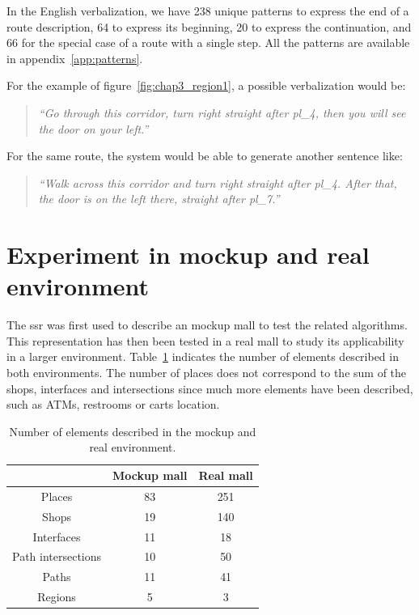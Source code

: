 In the English verbalization, we have 238 unique patterns to express the end of a route description, 64 to express its beginning, 20 to express the continuation, and 66 for the special case of a route with a single step. All the patterns are available in appendix~\ref{app:patterns}.

For the example of figure~\ref{fig:chap3_region1}, a possible verbalization would be:

\begin{quote} 
\centering 
\textit{
``Go through this corridor, turn right straight after pl\_4, then you will see the door on your left.''}
\end{quote}

For the same route, the system would be able to generate another sentence like:

\begin{quote} 
\centering 
\textit{
``Walk across this corridor and turn right straight after pl\_4. After that, the door is on the left there, straight after pl\_7.''}
\end{quote}

\section{Experiment in mockup and real environment}

The \acrshort{ssr} was first used to describe an mockup mall to test the related algorithms. This representation has then been tested in a real mall to study its applicability in a larger environment. Table~\ref{tab:chap3_count} indicates the number of elements described in both environments. The number of places does not correspond to the sum of the shops, interfaces and intersections since much more elements have been described, such as ATMs, restrooms or carts location.

\begin{table}[!h]
\begin{center}
   \begin{tabular}{ | c || c | c | }
     \hline
                        & Mockup mall & Real mall \\ \hline \hline
     Places             & 83            & 251   \\ \hline
     Shops              & 19            & 140   \\ \hline
     Interfaces         & 11            & 18    \\ \hline
     Path intersections & 10            & 50    \\ \hline
     Paths              & 11            & 41    \\ \hline
     Regions            & 5             & 3     \\
     \hline
   \end{tabular}
 \end{center}
 \caption{\label{tab:chap3_count} Number of elements described in the mockup and real environment.}
\end{table}

